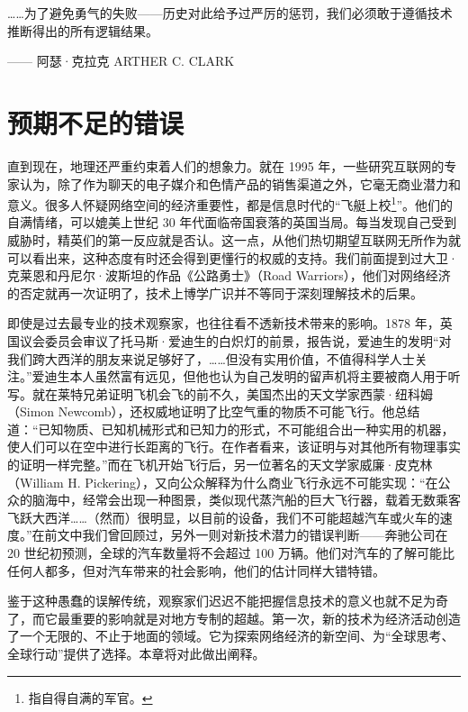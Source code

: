 \begin{tcolorbox}
\kaishu ……为了避免勇气的失败——历史对此给予过严厉的惩罚，我们必须敢于遵循技术推断得出的所有逻辑结果。
\begin{flushright}
—— 阿瑟·克拉克 ARTHER C. CLARK    
\end{flushright}
\end{tcolorbox}

\section{预期不足的错误}
直到现在，地理还严重约束着人们的想象力。就在 1995 年，一些研究互联网的专家认为，除了作为聊天的电子媒介和色情产品的销售渠道之外，它毫无商业潜力和意义。很多人怀疑网络空间的经济重要性，都是信息时代的“飞艇上校\footnote{指自得自满的军官。}”。他们的自满情绪，可以媲美上世纪 30 年代面临帝国衰落的英国当局。每当发现自己受到威胁时，精英们的第一反应就是否认。这一点，从他们热切期望互联网无所作为就可以看出来，这种态度有时还会得到更懂行的权威的支持。我们前面提到过大卫·克莱恩和丹尼尔·波斯坦的作品《公路勇士》（Road Warriors），他们对网络经济的否定就再一次证明了，技术上博学广识并不等同于深刻理解技术的后果。

即使是过去最专业的技术观察家，也往往看不透新技术带来的影响。1878 年，英国议会委员会审议了托马斯·爱迪生的白炽灯的前景，报告说，爱迪生的发明“对我们跨大西洋的朋友来说足够好了，……但没有实用价值，不值得科学人士关注。”爱迪生本人虽然富有远见，但他也认为自己发明的留声机将主要被商人用于听写。就在莱特兄弟证明飞机会飞的前不久，美国杰出的天文学家西蒙·纽科姆（Simon Newcomb），还权威地证明了比空气重的物质不可能飞行。他总结道：“已知物质、已知机械形式和已知力的形式，不可能组合出一种实用的机器，使人们可以在空中进行长距离的飞行。在作者看来，该证明与对其他所有物理事实的证明一样完整。”而在飞机开始飞行后，另一位著名的天文学家威廉·皮克林（William H. Pickering），又向公众解释为什么商业飞行永远不可能实现：“在公众的脑海中，经常会出现一种图景，类似现代蒸汽船的巨大飞行器，载着无数乘客飞跃大西洋……（然而）很明显，以目前的设备，我们不可能超越汽车或火车的速度。”在前文中我们曾回顾过，另外一则对新技术潜力的错误判断——奔驰公司在 20 世纪初预测，全球的汽车数量将不会超过 100 万辆。他们对汽车的了解可能比任何人都多，但对汽车带来的社会影响，他们的估计同样大错特错。

鉴于这种愚蠢的误解传统，观察家们迟迟不能把握信息技术的意义也就不足为奇了，而它最重要的影响就是对地方专制的超越。第一次，新的技术为经济活动创造了一个无限的、不止于地面的领域。它为探索网络经济的新空间、为“全球思考、全球行动”提供了选择。本章将对此做出阐释。

